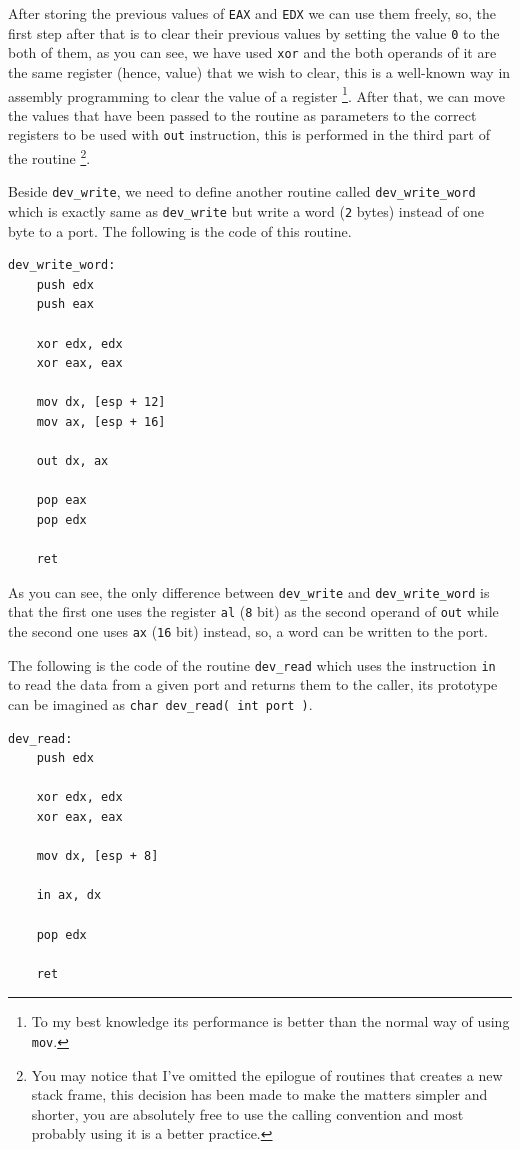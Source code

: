 After storing the previous values of \lstinline!EAX! and \lstinline!EDX!
we can use them freely, so, the first step after that is to clear their
previous values by setting the value \lstinline!0! to the both of them,
as you can see, we have used \lstinline!xor! and the both operands of it
are the same register (hence, value) that we wish to clear, this is a
well-known way in assembly programming to clear the value of a register
\footnote{To my best knowledge its performance is better than the normal
  way of using \lstinline!mov!.}. After that, we can move the values
that have been passed to the routine as parameters to the correct
registers to be used with \lstinline!out! instruction, this is performed
in the third part of the routine \footnote{You may notice that I've
  omitted the epilogue of routines that creates a new stack frame, this
  decision has been made to make the matters simpler and shorter, you
  are absolutely free to use the calling convention and most probably
  using it is a better practice.}.

Beside \lstinline!dev_write!, we need to define another routine called
\lstinline!dev_write_word! which is exactly same as
\lstinline!dev_write! but write a word (\lstinline!2! bytes) instead of
one byte to a port. The following is the code of this routine.

\begin{lstlisting}
dev_write_word:
    push edx
    push eax    
    
    xor edx, edx
    xor eax, eax
    
    mov dx, [esp + 12]
    mov ax, [esp + 16]
    
    out dx, ax 
    
    pop eax
    pop edx
    
    ret
\end{lstlisting}

As you can see, the only difference between \lstinline!dev_write! and
\lstinline!dev_write_word! is that the first one uses the register
\lstinline!al! (\lstinline!8! bit) as the second operand of
\lstinline!out! while the second one uses \lstinline!ax! (\lstinline!16!
bit) instead, so, a word can be written to the port.

The following is the code of the routine \lstinline!dev_read! which uses
the instruction \lstinline!in! to read the data from a given port and
returns them to the caller, its prototype can be imagined as
\lstinline!char dev_read( int port )!.

\begin{lstlisting}
dev_read:
    push edx
    
    xor edx, edx
    xor eax, eax
    
    mov dx, [esp + 8]
    
    in ax, dx
    
    pop edx
    
    ret
\end{lstlisting}

